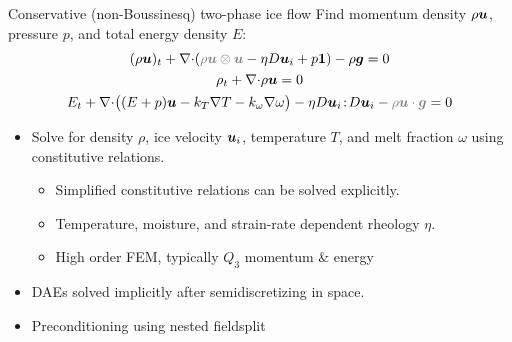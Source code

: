 \documentclass{beamer}
\begin{document}


\newcommand\smallterm[1]{{\color{gray} #1}}
\begin{frame}{Conservative (non-Boussinesq) two-phase ice flow}
  Find momentum density $\rho\bm u$, pressure $p$, and total energy density $E$:
  \begin{gather*}
    (\rho\uu)_t + \div (\smallterm{\rho\uu\otimes\uu} - \eta D\uu_i + p\bm 1) - \rho \bm g = 0 \\
    \rho_t + \div \rho\uu = 0 \\
    E_t + \div \big((E+p)\uu - k_T\nabla T - k_\omega\nabla\omega \big) - \eta D\uu_i\tcolon D\uu_i - \smallterm{\rho\uu\cdot\bm g} = 0
  \end{gather*}
\begin{itemize}
\item Solve for density $\rho$, ice velocity $\bm u_i$, temperature $T$, and melt fraction $\omega$ using constitutive relations.
  \begin{itemize}
  \item Simplified constitutive relations can be solved explicitly.
  \item Temperature, moisture, and strain-rate dependent rheology $\eta$.
  \item High order FEM, typically $Q_3$ momentum \& energy
  \end{itemize}
\item DAEs solved implicitly after semidiscretizing in space.
\item Preconditioning using nested fieldsplit
\end{itemize}
\end{frame}



\end{document}
